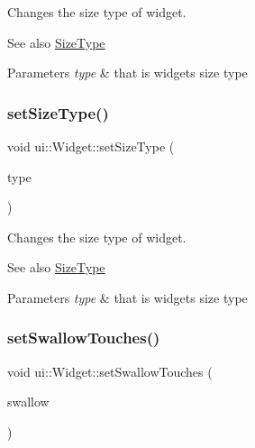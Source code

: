 Changes the size type of widget.

\begin{DoxySeeAlso}{See also}
{\ttfamily \hyperlink{classui_1_1Widget_ab7035fc10a00c756523be6bc57cf801c}{Size\+Type}}
\end{DoxySeeAlso}

\begin{DoxyParams}{Parameters}
{\em type} & that is widget\textquotesingle{}s size type \\
\hline
\end{DoxyParams}
\mbox{\label{classui_1_1Widget_a0227da458f10e9f3bcb4e2137a0a05e5}} 
\subsubsection{\texorpdfstring{set\+Size\+Type()}{setSizeType()}\hspace{0.1cm}{\footnotesize\ttfamily [2/2]}}
{\footnotesize\ttfamily void ui\+::\+Widget\+::set\+Size\+Type (\begin{DoxyParamCaption}\item[{\hyperlink{classui_1_1Widget_ab7035fc10a00c756523be6bc57cf801c}{Size\+Type}}]{type }\end{DoxyParamCaption})}

Changes the size type of widget.

\begin{DoxySeeAlso}{See also}
{\ttfamily \hyperlink{classui_1_1Widget_ab7035fc10a00c756523be6bc57cf801c}{Size\+Type}}
\end{DoxySeeAlso}

\begin{DoxyParams}{Parameters}
{\em type} & that is widget\textquotesingle{}s size type \\
\hline
\end{DoxyParams}
\mbox{\label{classui_1_1Widget_a6c032c79a09975f53518172606f07c14}} 
\subsubsection{\texorpdfstring{set\+Swallow\+Touches()}{setSwallowTouches()}\hspace{0.1cm}{\footnotesize\ttfamily [1/2]}}
{\footnotesize\ttfamily void ui\+::\+Widget\+::set\+Swallow\+Touches (\begin{DoxyParamCaption}\item[{bool}]{swallow }\end{DoxyParamCaption})}



